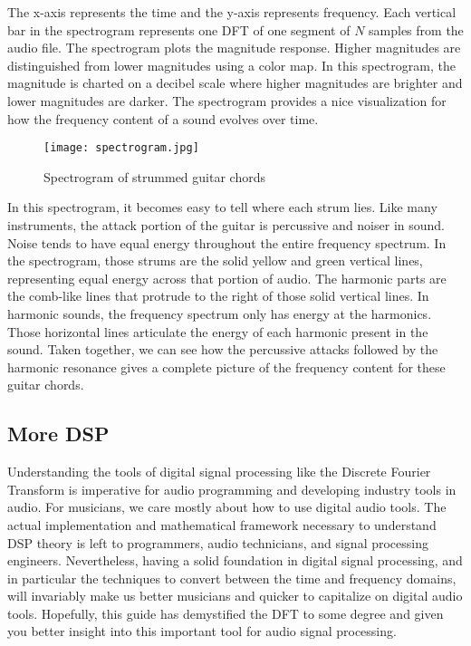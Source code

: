 The x-axis represents the time and the y-axis represents frequency.  Each vertical bar in the spectrogram 
represents one DFT of one segment of $N$ samples from the audio file.  The spectrogram plots the magnitude
response.  Higher magnitudes are distinguished from lower magnitudes using a color map.  In this 
spectrogram, the magnitude is charted on a decibel scale where higher magnitudes are brighter and lower magnitudes
are darker.  The spectrogram provides a nice visualization for how the frequency content of a sound evolves over
time.  

\begin{figure}[h]
	\caption{Spectrogram of strummed guitar chords}
	\label{fig:spectrogram}
	\begin{center}
		\texttt{[image: spectrogram.jpg]}
	\end{center}
\end{figure}

In this spectrogram, it becomes easy to tell where each strum lies.  Like many instruments, the attack portion of
the guitar is percussive and noiser in sound.  Noise tends to have equal energy throughout the entire frequency 
spectrum.  In the spectrogram, those strums are the solid yellow and green vertical lines, representing equal
energy across that portion of audio.  The harmonic parts are the comb-like lines that protrude to the right
of those solid vertical lines.  In harmonic sounds, the frequency spectrum only has energy at the harmonics.
Those horizontal lines articulate the energy of each harmonic present in the sound.  Taken together, we can see
how the percussive attacks followed by the harmonic resonance gives a complete picture of the frequency
content for these guitar chords.

\subsection*{More DSP}

Understanding the tools of digital signal processing like the Discrete Fourier Transform is imperative for
audio programming and developing industry tools in audio.  For musicians, we care mostly about how to use
digital audio tools.  The actual 
implementation and mathematical framework 
necessary to understand DSP theory is left to programmers, audio technicians, and signal processing engineers.  Nevertheless, having a 
solid foundation in digital signal processing, and in particular the techniques to convert between
the time and frequency domains, will invariably make us better musicians and quicker to capitalize
on digital audio tools.  Hopefully, this guide has demystified the DFT to some degree and given you
better insight into this important tool for audio signal processing.